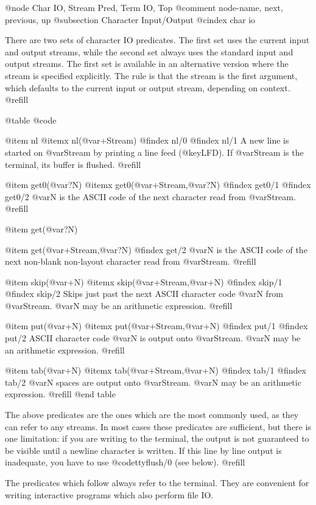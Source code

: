 @node Char IO, Stream Pred, Term IO, Top
@comment  node-name,  next,  previous,  up
@subsection Character Input/Output
@cindex char io

There are two sets of character IO predicates.  The first set uses the
current input and output streams, while the second set always uses the
standard input and output streams.  The first set is available in an
alternative version where the stream is specified explicitly.  The rule
is that the stream is the first argument, which defaults to the current
input or output stream, depending on context. @refill

@table @code

@item nl
@itemx nl(@var{+Stream})
@findex nl/0
@findex nl/1
A new line is started on @var{Stream} by printing a line feed
(@key{LFD}).  If @var{Stream} is the terminal, its buffer is flushed.
@refill

@item get0(@var{?N})
@itemx get0(@var{+Stream},@var{?N})
@findex get0/1
@findex get0/2
@var{N} is the ASCII code of the next character read from @var{Stream}.
@refill

@item get(@var{?N})

@item get(@var{+Stream},@var{?N})
@findex get/2
@var{N} is the ASCII code of the next non-blank non-layout character
read from @var{Stream}. @refill

@item skip(@var{+N})
@itemx skip(@var{+Stream},@var{+N})
@findex skip/1
@findex skip/2
Skips just past the next ASCII character code @var{N} from @var{Stream}.
@var{N} may be an arithmetic expression. @refill

@item put(@var{+N})
@itemx put(@var{+Stream},@var{+N})
@findex put/1
@findex put/2
ASCII character code @var{N} is output onto @var{Stream}.  @var{N} may
be an arithmetic expression. @refill

@item tab(@var{+N})
@itemx tab(@var{+Stream},@var{+N})
@findex tab/1
@findex tab/2
@var{N} spaces are output onto @var{Stream}.  @var{N} may be an
arithmetic expression. @refill
@end table

The above predicates are the ones which are the most commonly used, as
they can refer to any streams.  In most cases these predicates are
sufficient, but there is one limitation: if you are writing to the
terminal, the output is not guaranteed to be visible until a newline
character is written.  If this line by line output is inadequate, you
have to use @code{ttyflush/0} (see below). @refill

The predicates which follow always refer to the terminal.  They are
convenient for writing interactive programs which also perform file IO.

